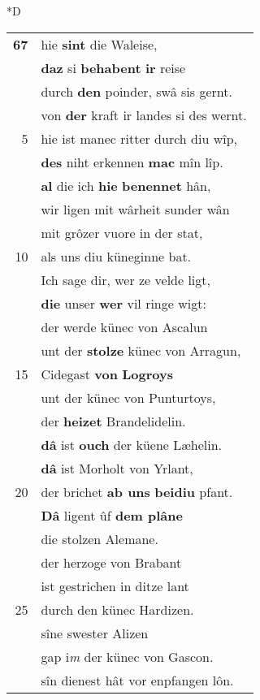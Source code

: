 \documentclass[8pt,a4paper,notitlepage]{article}
\begin{document}
\begin{table}[ht]
\begin{minipage}[t]{0.5\linewidth}
\small
\begin{center}*D
\end{center}
\begin{tabular}{rl}
\textbf{67} & hie \textbf{sint} die Waleise,\\ 
 & \textbf{daz} si \textbf{behabent} \textbf{ir} reise\\ 
 & durch \textbf{den} poinder, swâ sis gernt.\\ 
 & von \textbf{der} kraft ir landes si des wernt.\\ 
5 & hie ist manec ritter durch diu wîp,\\ 
 & \textbf{des} niht erkennen \textbf{mac} mîn lîp.\\ 
 & \textbf{al} die ich \textbf{hie} \textbf{benennet} hân,\\ 
 & wir ligen mit wârheit sunder wân\\ 
 & mit grôzer vuore in der stat,\\ 
10 & als uns diu küneginne bat.\\ 
 & Ich sage dir, wer ze velde ligt,\\ 
 & \textbf{die} unser \textbf{wer} vil ringe wigt:\\ 
 & der werde künec von Ascalun\\ 
 & unt der \textbf{stolze} künec von Arragun,\\ 
15 & Cidegast \textbf{von} \textbf{Logroys}\\ 
 & unt der künec von Punturtoys,\\ 
 & der \textbf{heizet} Brandelidelin.\\ 
 & \textbf{dâ} ist \textbf{ouch} der küene Læhelin.\\ 
 & \textbf{dâ} ist Morholt von Yrlant,\\ 
20 & der brichet \textbf{ab uns} \textbf{beidiu} pfant.\\ 
 & \textbf{Dâ} ligent ûf \textbf{dem plâne}\\ 
 & die stolzen Alemane.\\ 
 & der herzoge von Brabant\\ 
 & ist gestrichen in ditze lant\\ 
25 & durch den künec Hardizen.\\ 
 & sîne swester Alizen\\ 
 & gap i\textit{m} der künec von Gascon.\\ 
 & sîn dienest hât vor enpfangen lôn.\\ 

\end{tabular}
\end{minipage}
\end{table}
\end{document}
